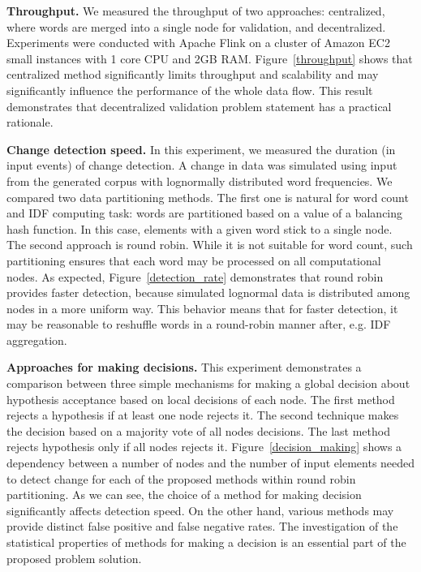 {\bf Throughput.} We measured the throughput of two approaches: centralized, where words are merged into a single node for validation, and decentralized. Experiments were conducted with Apache Flink on a cluster of Amazon EC2 small instances with 1 core CPU and 2GB RAM. Figure~\ref{throughput} shows that centralized method significantly limits throughput and scalability and may significantly influence the performance of the whole data flow. This result demonstrates that decentralized validation problem statement has a practical rationale.

{\bf Change detection speed.} In this experiment, we measured the duration (in input events) of change detection. A change in data was simulated using input from the generated corpus with lognormally distributed word frequencies. We compared two data partitioning methods. The first one is natural for word count and IDF computing task: words are partitioned based on a value of a balancing hash function. In this case, elements with a given word stick to a single node. The second approach is round robin. While it is not suitable for word count, such partitioning ensures that each word may be processed on all computational nodes. As expected, Figure~\ref{detection_rate} demonstrates that round robin provides faster detection, because simulated lognormal data is distributed among nodes in a more uniform way. This behavior means that for faster detection, it may be reasonable to reshuffle words in a round-robin manner after, e.g. IDF aggregation.

{\bf Approaches for making decisions.} This experiment demonstrates a comparison between three simple mechanisms for making a global decision about hypothesis acceptance based on local decisions of each node. The first method rejects a hypothesis if at least one node rejects it. The second technique makes the decision based on a majority vote of all nodes decisions. The last method rejects hypothesis only if all nodes rejects it. Figure~\ref{decision_making} shows a dependency between a number of nodes and the number of input elements needed to detect change for each of the proposed methods within round robin partitioning. As we can see, the choice of a method for making decision significantly affects detection speed. On the other hand, various methods may provide distinct false positive and false negative rates. The investigation of the statistical properties of methods for making a decision is an essential part of the proposed problem solution.